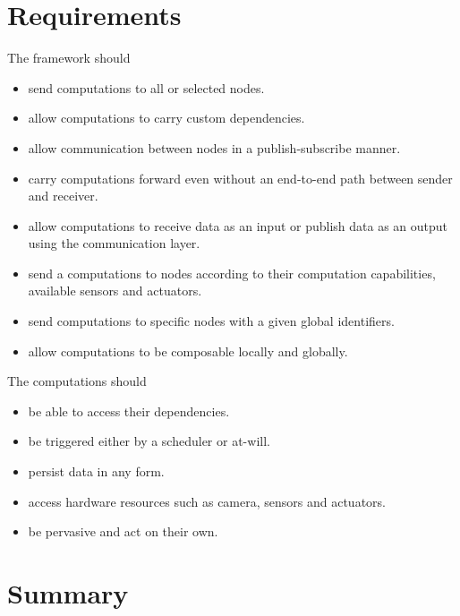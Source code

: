 \section{Requirements}
The framework should
\begin{itemize}
	\item  send computations to all or selected nodes.
	\item  allow computations to carry custom dependencies.
	\item  allow communication between nodes in a publish-subscribe manner.
	
	\item  carry computations forward even without an end-to-end path between sender and receiver.
	\item  allow computations to receive data as an input or publish data as an output using the communication layer.
	
	\item  send a computations to nodes according to their computation capabilities, available sensors and actuators.
	
	\item  send computations to  specific nodes with a given global identifiers.
	
	\item  allow computations to be composable locally and globally.
	
\end{itemize}

The computations should
\begin{itemize}
	\item  be able to access their dependencies.
	\item  be triggered either by a scheduler or at-will.
	\item  persist data in any form.
	\item  access hardware resources such as camera, sensors and actuators.
	\item  be pervasive and act on their own.
\end{itemize}




\section{Summary}



